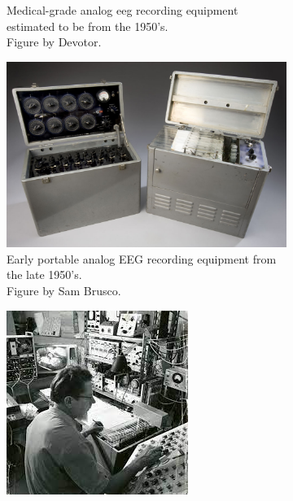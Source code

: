\begin{figure}[ht]
\begin{minipage}{\textwidth}
\begin{subfigure}{.48\textwidth}
        \captionsetup{width=0.9\linewidth}
        \captionsetup{justification=centering}
        \caption{Medical-grade analog \gls{eeg} recording equipment estimated to be from the 1950's. \\Figure by Devotor\footnotemark[1].}
        \label{fig:eeg_hardware_evolution_2}
    \end{subfigure}
    \captionsetup{width=0.9\linewidth}
    \bigskip
    \begin{subfigure}{.48\textwidth}
        \centering
        \includegraphics[width=\textwidth]{images/hardware/early_portable_eeg.jpg}
        \captionsetup{width=0.9\linewidth}
        \captionsetup{justification=centering}
        \caption{Early portable analog EEG recording equipment from the late 1950's. \\Figure by Sam Brusco\footnotemark[2]. }
        \label{fig:eeg_hardware_evolution_3}
    \end{subfigure}
    \hfill
    \begin{subfigure}{.48\textwidth}
        \centering
        \includegraphics[width=\textwidth]{images/hardware/grey_walter.jpg}

\end{subfigure}
\end{minipage}
\end{figure}
